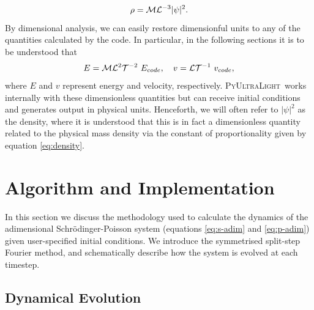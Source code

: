 \documentclass[a4paper,11pt]{article}
\newcommand{\PyUltraLight}{\textsc{PyUltraLight}\xspace}
\begin{document}
\begin{equation}\label{eq:density}
    \rho=\CMcal{M}\CMcal{L}^{-3}\vert\psi\vert^2.
\end{equation}
By dimensional analysis, we can easily restore dimensionful units to any of the quantities calculated by the code. In particular, in the following sections it is to be understood that
\begin{equation}\label{eq:density}
    E=\CMcal{M}\CMcal{L}^2\CMcal{T}^{-2}\ E_{code}, \quad v=\CMcal{L}\CMcal{T}^{-1}\ v_{code}, 
\end{equation}
where $E$ and $v$ represent energy and velocity, respectively. \PyUltraLight\ works internally with these dimensionless quantities but can receive initial conditions and generates output in physical units. Henceforth, we will often refer to $\vert\psi\vert^2$  as the density, where it is understood that this is in fact a dimensionless quantity related to the physical mass density via the constant of proportionality given by equation \ref{eq:density}.




\section{Algorithm and Implementation}\label{sec:implementation}

In this section we discuss the methodology used to calculate the dynamics of the adimensional  Schr{\"o}dinger-Poisson system (equations \ref{eq:s-adim} and \ref{eq:p-adim}) given user-specified initial conditions. We introduce the symmetrised split-step Fourier method, and schematically describe  how the system is evolved at each timestep. 

\subsection{Dynamical Evolution}\label{sec:dynamics}
\end{document}
